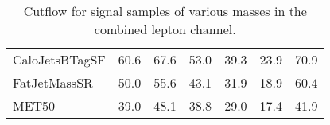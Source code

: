 \begin{table}[!htbp]
\begin{center}
\begin{adjustbox}{max width=\textwidth}
\begin{tabular}{| l | c | c | c | c | c | c |}
CaloJetsBTagSF            &      60.6       &      67.6       &      53.0       &      39.3       &      23.9       &      70.9       \\
FatJetMassSR              &      50.0       &      55.6       &      43.1       &      31.9       &      18.9       &      60.4       \\
MET50                     &      39.0       &      48.1       &      38.8       &      29.0       &      17.4       &      41.9       \\
\end{tabular}
\end{adjustbox}
\end{center}
\caption{Cutflow for signal samples of various masses in the combined lepton channel.}
\label{tab:boosted_cutflow_signals_leptonchannel}
\end{table}


%
%
%

